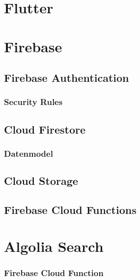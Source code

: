 




\section{Flutter}





\section{Firebase}

\subsection{Firebase Authentication}
\subsubsection{Security Rules}
\subsection{Cloud Firestore}
\subsubsection{Datenmodel}
\subsection{Cloud Storage}
\subsection{Firebase Cloud Functions}


\section{Algolia Search}
\subsubsection{Firebase Cloud Function}
